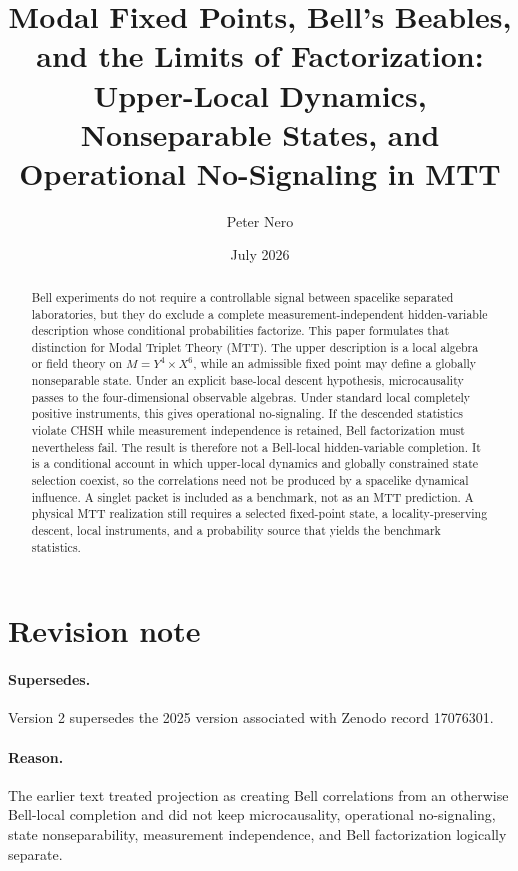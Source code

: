 \documentclass[11pt]{article}
\title{\Large\bf
Modal Fixed Points, Bell's Beables, and the Limits of Factorization:\\[0.25em]
Upper-Local Dynamics, Nonseparable States, and Operational No-Signaling in MTT}
\author{Peter Nero}
\date{July 2026}
\theoremstyle{remark}
\begin{document}
\maketitle

\begin{abstract}
Bell experiments do not require a controllable signal between spacelike
separated laboratories, but they do exclude a complete measurement-independent
hidden-variable description whose conditional probabilities factorize.  This
paper formulates that distinction for Modal Triplet Theory (MTT).  The upper
description is a local algebra or field theory on
$M=Y^4\times X^6$, while an admissible fixed point may define a globally
nonseparable state.  Under an explicit base-local descent hypothesis,
microcausality passes to the four-dimensional observable algebras.  Under
standard local completely positive instruments, this gives operational
no-signaling.  If the descended statistics violate CHSH while measurement
independence is retained, Bell factorization must nevertheless fail.  The
result is therefore not a Bell-local hidden-variable completion.  It is a
conditional account in which upper-local dynamics and globally constrained
state selection coexist, so the correlations need not be produced by a
spacelike dynamical influence.  A singlet packet is included as a benchmark,
not as an MTT prediction.  A physical MTT realization still requires a selected
fixed-point state, a locality-preserving descent, local instruments, and a
probability source that yields the benchmark statistics.
\end{abstract}

\section*{Revision note}

\paragraph{Supersedes.}
Version 2 supersedes the 2025 version associated with Zenodo record 17076301.

\paragraph{Reason.}
The earlier text treated projection as creating Bell correlations from an
otherwise Bell-local completion and did not keep microcausality, operational
no-signaling, state nonseparability, measurement independence, and Bell
factorization logically separate.
\end{document}
